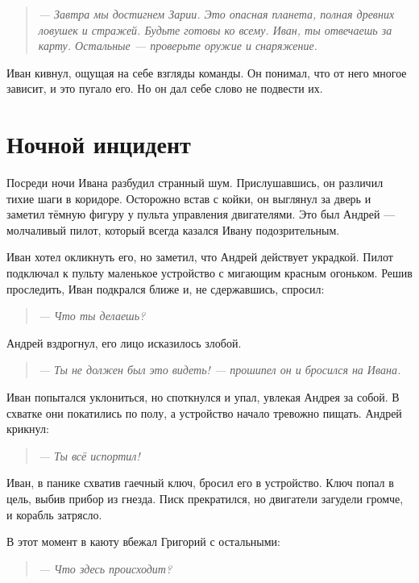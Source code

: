 \documentclass[12pt,a4paper]{book}
\newenvironment{dialogue}{\begin{quote}\itshape}{\end{quote}}
\begin{document}
\begin{dialogue}
--- Завтра мы достигнем Зарии. Это опасная планета, полная древних ловушек и стражей. Будьте готовы ко всему. Иван, ты отвечаешь за карту. Остальные --- проверьте оружие и снаряжение.
\end{dialogue}

Иван кивнул, ощущая на себе взгляды команды. Он понимал, что от него многое зависит, и это пугало его. Но он дал себе слово не подвести их.

\section*{Ночной инцидент}

Посреди ночи Ивана разбудил странный шум. Прислушавшись, он различил тихие шаги в коридоре. Осторожно встав с койки, он выглянул за дверь и заметил тёмную фигуру у пульта управления двигателями. Это был Андрей --- молчаливый пилот, который всегда казался Ивану подозрительным.

Иван хотел окликнуть его, но заметил, что Андрей действует украдкой. Пилот подключал к пульту маленькое устройство с мигающим красным огоньком. Решив проследить, Иван подкрался ближе и, не сдержавшись, спросил:

\begin{dialogue}
--- Что ты делаешь?
\end{dialogue}

Андрей вздрогнул, его лицо исказилось злобой.

\begin{dialogue}
--- Ты не должен был это видеть! --- прошипел он и бросился на Ивана.
\end{dialogue}

Иван попытался уклониться, но споткнулся и упал, увлекая Андрея за собой. В схватке они покатились по полу, а устройство начало тревожно пищать. Андрей крикнул:

\begin{dialogue}
--- Ты всё испортил!
\end{dialogue}

Иван, в панике схватив гаечный ключ, бросил его в устройство. Ключ попал в цель, выбив прибор из гнезда. Писк прекратился, но двигатели загудели громче, и корабль затрясло.

В этот момент в каюту вбежал Григорий с остальными:

\begin{dialogue}
--- Что здесь происходит?
\end{dialogue}
\end{document}
